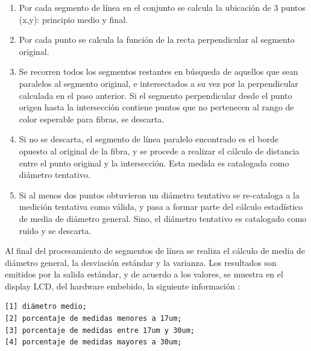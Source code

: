\documentclass[runningheads,a4paper]{llncs}
\begin{document}
\begin{enumerate}
\item Por cada segmento de línea en el conjunto se calcula la ubicación de 3 puntos (x,y):
principio medio y final. 
\item Por cada punto se calcula la función de la recta perpendicular al segmento original.
\item Se recorren todos los segmentos restantes en búsqueda de aquellos que sean paralelos al segmento original, e intersectados a su vez por la perpendicular calculada en el paso anterior.
Si el segmento perpendicular desde el punto origen hasta la intersección contiene puntos que no pertenecen al rango de color esperable para fibras, se descarta.
\item Si no se descarta,  el segmento de línea paralelo encontrado es el borde opuesto al original de la fibra, y se procede a realizar el cálculo de distancia entre el punto original y la intersección. Esta medida es catalogada como diámetro tentativo.
\item Si al menos dos puntos obtuvieron un diámetro tentativo se re-cataloga a la medición tentativa como válida, y pasa a formar parte del cálculo estadístico de media de diámetro general. Sino, el diámetro tentativo es catalogado como ruido y se descarta.
\end{enumerate}

	Al final del procesamiento de segmentos de línea se realiza el cálculo de media de diámetro general, la desviación estándar y la varianza.
	Los resultados son emitidos por la salida estándar, y de acuerdo a los valores, se muestra en el display LCD, del hardware embebido, la siguiente información :
\begin{Verbatim}
[1] diámetro medio;
[2] porcentaje de medidas menores a 17um;
[3] porcentaje de medidas entre 17um y 30um;
[4] porcentaje de medidas mayores a 30um;
\end{Verbatim}
\end{document}
